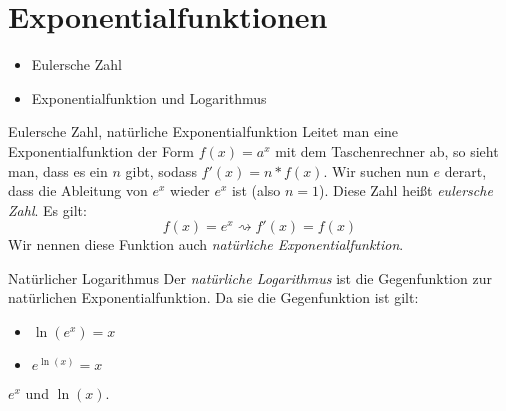 \chapter{Exponentialfunktionen}
\begin{inhalt}
  \begin{itemize}
    \item Eulersche Zahl
    \item Exponentialfunktion und Logarithmus
  \end{itemize}
\end{inhalt}

\begin{bla}{Eulersche Zahl, natürliche Exponentialfunktion}
  Leitet man eine Exponentialfunktion der Form $f(x)=a^x$ mit dem Taschenrechner ab, so sieht man, dass es ein $n$ gibt, sodass $f'(x)=n*f(x)$.
  Wir suchen nun $e$ derart, dass die Ableitung von $e^x$ wieder $e^x$ ist (also $n=1$).
  Diese Zahl heißt \emph{eulersche Zahl}. Es gilt:
  \begin{equation*}
    f(x)=e^x \rightsquigarrow f'(x)=f(x)
  \end{equation*}
  Wir nennen diese Funktion auch \emph{natürliche Exponentialfunktion}.
\end{bla}

\begin{bla}{Natürlicher Logarithmus}
  Der \emph{natürliche Logarithmus} ist die Gegenfunktion zur natürlichen
  Exponentialfunktion. Da sie die Gegenfunktion ist gilt:
  \begin{itemize}
    \item $\ln(e^x)=x$
    \item $e^{\ln(x)}=x$
  \end{itemize}
\end{bla}

\begin{marginfigure}
  \caption{$e^x$ und $\ln(x)$.}
\end{marginfigure}

